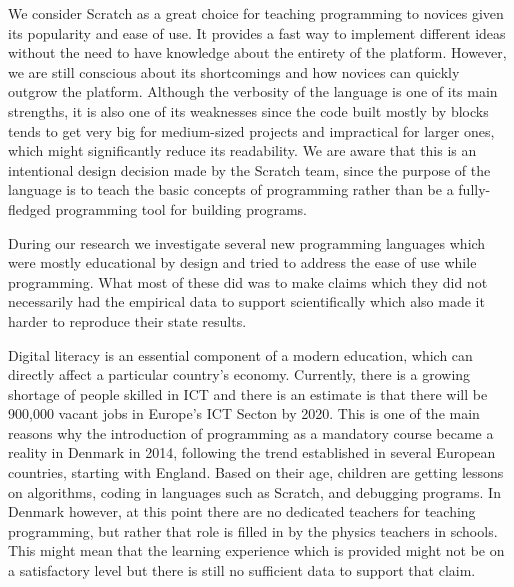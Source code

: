 We consider Scratch as a great choice for teaching programming to novices given its popularity and ease of use. It provides a fast way to implement different ideas without the need to have knowledge about the entirety of the platform. However, we are still conscious about its shortcomings and how novices can quickly outgrow the platform. Although the verbosity of the language is one of its main strengths, it is also one of its weaknesses since the code built mostly by blocks tends to get very big for medium-sized projects and impractical for larger ones, which might significantly reduce its readability. We are aware that this is an intentional design decision made by the Scratch team, since the purpose of the language is to teach the basic concepts of programming rather than be a fully-fledged programming tool for building programs. 

During our research we investigate several new programming languages which were mostly educational by design and tried to address the ease of use while programming. What most of these did was to make claims which they did not necessarily had the empirical data to support scientifically which also made it harder to reproduce their state results. 

Digital literacy is an essential component of a modern education, which can directly affect a particular country's economy. Currently, there is a growing shortage of people skilled in ICT and there is an estimate is that there will be 900,000 vacant jobs in Europe's ICT Secton by 2020. This is one of the main reasons why the introduction of programming as a mandatory course became a reality in Denmark in 2014, following the trend established in several European countries, starting with England. Based on their age, children are getting lessons on algorithms, coding in languages such as Scratch, and debugging programs. In Denmark however, at this point there are no dedicated teachers for teaching programming, but rather that role is filled in by the physics teachers in schools. This might mean that the learning experience which is provided might not be on a satisfactory level but there is still no sufficient data to support that claim.



